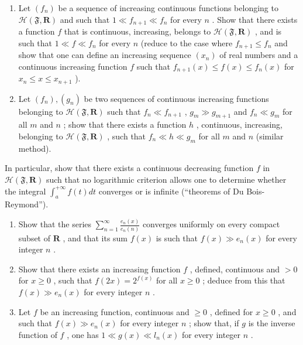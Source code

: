 \begin{enumerate}
\def\labelenumi{\alph{enumi})}
\setcounter{enumi}{1}
\item
  Let \((f_n)\) be a sequence of increasing continuous functions belonging to \(\mathcal{H}(\mathfrak{F},\mathbf{R})\) and such that \(1\ll f_{n + 1}\ll f_n\) for every \(n\) . Show that there exists a function \(f\) that is continuous, increasing, belongs to \(\mathcal{H}(\mathfrak{F},\mathbf{R})\) , and is such that \(1\ll f\ll f_n\) for every \(n\) (reduce to the case where \(f_{n + 1}\leqslant f_n\) and show that one can define an increasing sequence \((x_{n})\) of real numbers and a continuous increasing function \(f\) such that \(f_{n + 1}(x)\leqslant f(x)\leqslant f_n(x)\) for \(x_{n}\leqslant x\leqslant x_{n + 1}\) ).
\item
  Let \((f_n), (g_n)\) be two sequences of continuous increasing functions belonging to \(\mathcal{H}(\mathfrak{F}, \mathbf{R})\) such that \(f_n \ll f_{n+1}\) , \(g_m \gg g_{m+1}\) and \(f_n \ll g_m\) for all \(m\) and \(n\) ; show that there exists a function \(h\) , continuous, increasing, belonging to \(\mathcal{H}(\mathfrak{F}, \mathbf{R})\) , such that \(f_n \ll h \ll g_m\) for all \(m\) and \(n\) (similar method).
\end{enumerate}

In particular, show that there exists a continuous decreasing function \(f\) in \(\mathcal{H}(\mathfrak{F},\mathbf{R})\) such that no logarithmic criterion allows one to determine whether the integral \(\int_{a}^{+\infty}f(t)dt\) converges or is infinite (``theorems of Du Bois-Reymond'').

\begin{enumerate}
\def\labelenumi{\arabic{enumi})}
\setcounter{enumi}{8}
\item
  Show that the series \(\sum_{n=1}^{\infty} \frac{e_n(x)}{e_n(n)}\) converges uniformly on every compact subset of \(\mathbf{R}\) , and that its sum \(f(x)\) is such that \(f(x) \gg e_n(x)\) for every integer \(n\) .
\item
  Show that there exists an increasing function \(f\) , defined, continuous and \(> 0\) for \(x \geqslant 0\) , such that \(f(2x) = 2^{f(x)}\) for all \(x \geqslant 0\) ; deduce from this that \(f(x) \gg e_n(x)\) for every integer \(n\) .
\item
  Let \(f\) be an increasing function, continuous and \(\geqslant 0\) , defined for \(x \geqslant 0\) , and such that \(f(x) \gg e_n(x)\) for every integer \(n\) ; show that, if \(g\) is the inverse function of \(f\) , one has \(1 \ll g(x) \ll l_n(x)\) for every integer \(n\) .
\end{enumerate}

